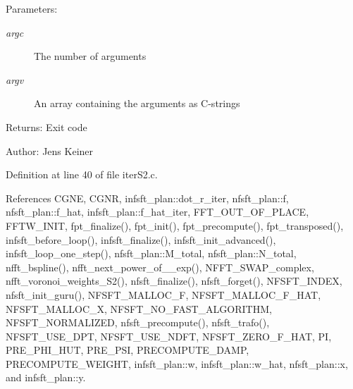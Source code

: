 \begin{Desc}
\item[Parameters:]
\begin{description}
\item[{\em argc}]The number of arguments \item[{\em argv}]An array containing the arguments as C-strings\end{description}
\end{Desc}
\begin{Desc}
\item[Returns:]Exit code\end{Desc}
\begin{Desc}
\item[Author:]Jens Keiner \end{Desc}


Definition at line 40 of file iter\-S2.c.

References CGNE, CGNR, infsft\_\-plan::dot\_\-r\_\-iter, nfsft\_\-plan::f, nfsft\_\-plan::f\_\-hat, infsft\_\-plan::f\_\-hat\_\-iter, FFT\_\-OUT\_\-OF\_\-PLACE, FFTW\_\-INIT, fpt\_\-finalize(), fpt\_\-init(), fpt\_\-precompute(), fpt\_\-transposed(), infsft\_\-before\_\-loop(), infsft\_\-finalize(), infsft\_\-init\_\-advanced(), infsft\_\-loop\_\-one\_\-step(), nfsft\_\-plan::M\_\-total, nfsft\_\-plan::N\_\-total, nfft\_\-bspline(), nfft\_\-next\_\-power\_\-of\_\_\-exp(), NFFT\_\-SWAP\_\-complex, nfft\_\-voronoi\_\-weights\_\-S2(), nfsft\_\-finalize(), nfsft\_\-forget(), NFSFT\_\-INDEX, nfsft\_\-init\_\-guru(), NFSFT\_\-MALLOC\_\-F, NFSFT\_\-MALLOC\_\-F\_\-HAT, NFSFT\_\-MALLOC\_\-X, NFSFT\_\-NO\_\-FAST\_\-ALGORITHM, NFSFT\_\-NORMALIZED, nfsft\_\-precompute(), nfsft\_\-trafo(), NFSFT\_\-USE\_\-DPT, NFSFT\_\-USE\_\-NDFT, NFSFT\_\-ZERO\_\-F\_\-HAT, PI, PRE\_\-PHI\_\-HUT, PRE\_\-PSI, PRECOMPUTE\_\-DAMP, PRECOMPUTE\_\-WEIGHT, infsft\_\-plan::w, infsft\_\-plan::w\_\-hat, nfsft\_\-plan::x, and infsft\_\-plan::y.